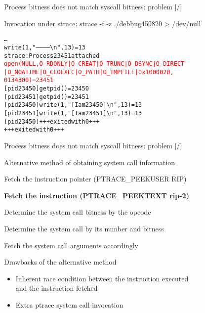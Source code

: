 \documentclass[unicode,aspectratio=169]{beamer}
\begin{document}
\begin{frame}[fragile]{Process bitness does not match syscall bitness: problem \hfill [\insertframenumber/\inserttotalframenumber]}
\Large
\begin{block}{Invocation under strace: strace -f -z ./debbug459820 > /dev/null}
\begin{alltt}
\ldots
write(1, "------------{\textbackslash}n", 13)          = 13
strace: Process 23451 attached
\textcolor{red}{open(NULL, O_RDONLY|O_CREAT|O_TRUNC|O_DSYNC|O_DIRECT
|O_NOATIME|O_CLOEXEC|O_PATH|O_TMPFILE|0x1000020,
0134300) = 23451}
[pid 23450] getpid()                    = 23450
[pid 23451] getpid()                    = 23451
[pid 23450] write(1, "[I am 23450]{\textbackslash}n", 13) = 13
[pid 23451] write(1, "[I am 23451]{\textbackslash}n", 13) = 13
[pid 23450] +++ exited with 0 +++
+++ exited with 0 +++
\end{alltt}
\end{block}
\end{frame}

\begin{frame}{Process bitness does not match syscall bitness: problem \hfill [\insertframenumber/\inserttotalframenumber]}
\Large
\begin{block}{Alternative method of obtaining system call information}
\begin{itemize}
	\item Fetch the instruction pointer (PTRACE\_PEEKUSER RIP)
	\item {\bf Fetch the instruction (PTRACE\_PEEKTEXT rip-2)
	\item Determine the system call bitness by the opcode}
	\item Determine the system call by its number and bitness
	\item Fetch the system call arguments accordingly
\end{itemize}
\end{block}

\begin{block}{Drawbacks of the alternative method}
\begin{itemize}
	\item Inherent race condition between the instruction executed \\ and the instruction fetched
	\item Extra ptrace system call invocation
\end{itemize}
\end{block}
\end{frame}
\end{document}
